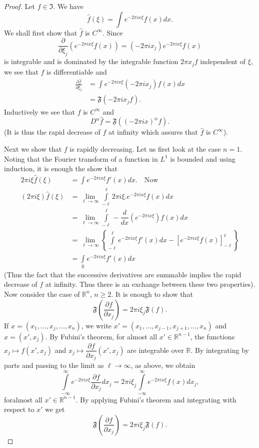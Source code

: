 \begin{proof}
Let $f\in \mathfrak{I}$. We have
$$
\widehat{f}(\xi)=\int e^{-2\pi ix\xi}f(x)dx.
$$
We shall first show that $\widehat{f}$ is $C^{\infty}$. Since
$$
\dfrac{\partial}{\partial \xi_{j}}\left(e^{-2\pi ix
  \xi}f(x)\right)=(-2\pi ix_{j})e^{-2\pi ix\xi}f(x)
$$
is integrable and is dominated by the integrable function $2\pi
x_{j}f$ independent of $\xi$, we see that $f$ is differentiable and
\begin{align*}
\frac{\partial \widehat{f}}{\partial \xi_{j}} &= \int e^{-2\pi
  ix\xi}(-2\pi ix_{j})f(x)dx\\[4pt]
&= \mathfrak{F}(-2\pi ix_{j}f).
\end{align*}
Inductively we see that $f$ is $C^{\infty}$ and
$$
D^{\alpha}\widehat{f}=\mathfrak{F}((-2\pi ix)^{\alpha}f).
$$\pageoriginale
(It is thus the rapid decrease of $f$ at infinity which assures that
$\widehat{f}$ is $C^{\infty}$).

Next we show that $f$ is rapidly decreasing. Let us first look at the
case $n=1$. Noting that the Fourier transform of a function in $L^{1}$
is bounded and using induction, it is enough the show that
\begin{align*}
2\pi i\xi \widehat{f}(\xi) &= \int e^{-2\pi
  ix\xi}f'(x)dx.\quad\text{Now}\\[4pt]
(2\pi i\xi)\widehat{f}(\xi) &= \lim\limits_{\ell \to
  \infty}\int\limits^{\ell}_{-\ell}2\pi i\xi. e^{-2\pi
  ix\xi}f(x)dx\\[4pt]
&= \lim\limits_{\ell\to
  \infty}\int\limits^{\ell}_{-\ell}-\dfrac{d}{dx}(e^{-2\pi
  ix\xi})f(x)dx\\[4pt]
&= \lim\limits_{\ell \to
  \infty}\left\{\int\limits^{\ell}_{-\ell}e^{-2\pi
  ix\xi}f'(x)dx-\left[e^{-2\pi
    ix\xi}f(x)\right]^{\ell}_{-\ell}\right\}\\[4pt]
&= \int\limits_{\mathbb{R}}e^{-2\pi ix\xi}f'(x)dx
\end{align*}
(Thus the fact that the successive derivatives are summable implies
the rapid decrease of $f$ at infinity. Thus there is an exchange
between these two properties). Now consider the case of
$\mathbb{R}^{n}$, $n\geq 2$. It is enough to show that
$$
\mathfrak{F}\left(\frac{\partial f}{\partial x_{j}}\right)=2\pi i\xi_{j}\mathfrak{F}(f).
$$
If $x=(x_{1},\ldots,x_{j},\ldots,x_{n})$, we write
$x'=(x_{1},\ldots,x_{j-1},x_{j+1},\ldots,x_{n})$ and
$x=(x',x_{j})$. By Fubini's theorem, for almost all $x'\in
\mathbb{R}^{n-1}$, the functions $x_{j}\mapsto f(x',x_{j})$ and
$x_{j}\mapsto \dfrac{\partial f}{\partial x_{j}}(x',x_{j})$ are
integrable over $\mathbb{R}$. By integrating by parts and passing to
the limit as $\ell\to \infty$, as above, we obtain
$$
\int\limits^{\infty}_{-\infty}e^{-2\pi ix\xi}\dfrac{\partial
  f}{\partial x_{j}}dx_{j}=2\pi
i\xi_{j}\int\limits^{\infty}_{-\infty}e^{-2\pi ix\xi}f(x)dx_{j},
$$
for\pageoriginale almost all $x'\in \mathbb{R}^{n-1}$. By applying
Fubini's theorem and integrating with respect to $x'$ we get
$$
\mathfrak{F}\left(\dfrac{\partial f}{\partial x_{j}}\right)=2\pi i\xi_{j}\mathfrak{F}(f).
$$
\end{proof}


